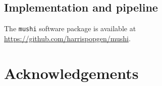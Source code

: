 \documentclass[11pt]{article}
\begin{document}
\subsection*{Implementation and pipeline}\label{sec:methods:tool}

The \texttt{mushi} software package is available at \url{https://github.com/harrispopgen/mushi}.

\section*{Acknowledgements}\label{sec:ack}





\appendix

\end{document}
